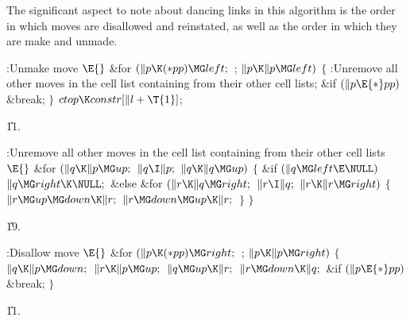 The significant aspect to note about dancing links in this algorithm is the
order in which moves are disallowed and reinstated, as well as the order
in which they are make and unmade.

\Y\B\4:Unmake move \X${}\E{}$\6
\&{for} ${}(\|p\K({*}\\{pp})\MG\\{left};{}$  ; ${}\|p\K\|p\MG\\{left}){}$\5
${}\{{}$\1\6
:Unremove all other moves in the cell list containing  from their
other cell lists\X;\6
\&{if} ${}(\|p\E{*}\\{pp}){}$\1\5
\&{break};\2\6
\4${}\}{}$\2\6
${}\\{ctop}\K\\{constr}[\|l+\T{1}]{}$;\par
\U11.\fi

\B{}:Unremove all other moves in the cell list containing  from
their other cell lists\X${}\E{}$\6
\&{for} ${}(\|q\K\|p\MG\\{up};{}$ ${}\|q\I\|p;{}$ ${}\|q\K\|q\MG\\{up}){}$\5
${}\{{}$\1\6
\&{if} ${}(\|q\MG\\{left}\E\NULL){}$\1\5
${}\|q\MG\\{right}\K\NULL;{}$\2\6
\&{else}\1\6
\&{for} ${}(\|r\K\|q\MG\\{right};{}$ ${}\|r\I\|q;{}$ ${}\|r\K\|r\MG%
\\{right}){}$\5
${}\{{}$\1\6
${}\|r\MG\\{up}\MG\\{down}\K\|r;{}$\6
${}\|r\MG\\{down}\MG\\{up}\K\|r;{}$\6
\4${}\}{}$\2\2\6
\4${}\}{}$\2\par
\U19.\fi

\B{}:Disallow move \X${}\E{}$\6
\&{for} ${}(\|p\K({*}\\{pp})\MG\\{right};{}$  ; ${}\|p\K\|p\MG\\{right}){}$\5
${}\{{}$\1\6
${}\|q\K\|p\MG\\{down};{}$\6
${}\|r\K\|p\MG\\{up};{}$\6
${}\|q\MG\\{up}\K\|r;{}$\6
${}\|r\MG\\{down}\K\|q;{}$\6
\&{if} ${}(\|p\E{*}\\{pp}){}$\1\5
\&{break};\2\6
\4${}\}{}$\2\par
\U11.\fi

